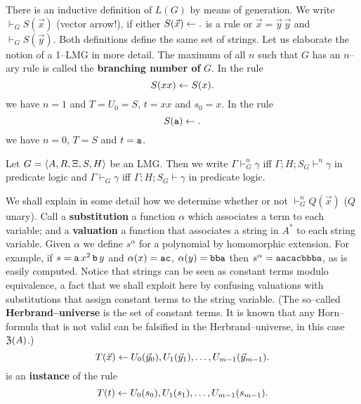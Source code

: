 There is an inductive definition of $L(G)$ by means of generation. 
We write $\vdash_G S(\vec{x})$ (vector arrow!), if either
$S(\vec{x}) \leftarrow.$ is a rule or $\vec{x} = \vec{y}\, \vec{y}$
and $\vdash_G S(\vec{y})$. Both definitions define the same set 
of strings. Let us elaborate the notion of a 1--LMG in more detail.
The maximum of all $n$ such that $G$ has an $n$--ary rule is 
called
the \textbf{branching number of} $G$. In the rule
\begin{equation}
S(xx) \leftarrow S(x).
\end{equation}
we have $n = 1$ and $T = U_0 = S$, $t = xx$ and $s_0 = x$. 
In the rule
\begin{equation}
S(\mbox{\tt a}) \leftarrow .
\end{equation}
we have $n = 0$, $T = S$ and $t = \mbox{\tt a}$.
\begin{defn}
Let $G = \langle A, R, \Xi, S, H\rangle$ be an LMG. Then we write 
$\Gamma \vdash^n_G \gamma$ iff $\Gamma;H;S_G \vdash^n \gamma$ in 
predicate logic and $\Gamma \vdash_G \gamma$ iff $\Gamma; 
H; S_G \vdash \gamma$ in predicate logic.
\end{defn}
We shall explain in some detail how we determine whether or not 
$\vdash_G^n Q(\vec{x})$ ($Q$ unary). Call a \textbf{substitution} a 
function $\alpha$ which associates a term to each variable; 
and a \textbf{valuation} a function that associates a string 
in $A^{\ast}$ to each string variable.
Given $\alpha$ we define $s^{\alpha}$ for a polynomial
by homomorphic extension. For example, if $s = \mbox{\tt a} \,
x^2 \, \mbox{\tt b} \, y$ and $\alpha(x) = \mbox{\tt ac}$, 
$\alpha(y) = \mbox{\tt bba}$ then $s^{\alpha} = \mbox{\tt aacacbbba}$, 
as is easily computed. Notice that strings can be seen as constant 
terms modulo equivalence, a fact that we shall exploit here by 
confusing valuations with substitutions that assign constant 
terms to the string variable. (The so--called \textbf{Herbrand--universe} 
is the set of constant terms. It is known that any Horn--formula 
that is not valid can be falsified in the Herbrand--universe, 
in this case $\mathfrak{Z}(A)$.)
\begin{equation}
T(\vec{x}) \leftarrow U_0(\vec{y}_0), U_1(\vec{y}_1),\dotsc,
U_{m-1}(\vec{y}_{m-1}).
\end{equation}
is an \textbf{instance} of the rule
\begin{equation}
T(t) \leftarrow U_0(s_0),U_1(s_1),\dotsc, U_{m-1}(s_{m-1}).
\end{equation}

